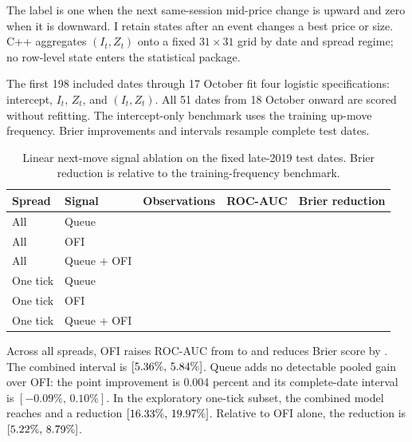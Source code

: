 \documentclass[11pt,a4paper]{article}
\begin{document}
The label is one when the next same-session mid-price change is upward and zero
when it is downward. I retain states after an event changes a best price or
size. C++ aggregates $(I_t,Z_t)$ onto a fixed $31\times31$ grid by date and
spread regime; no row-level state enters the statistical package.

The first 198 included dates through 17 October fit four logistic
specifications: intercept, $I_t$, $Z_t$, and $(I_t,Z_t)$. All 51 dates from 18
October onward are scored without refitting. The intercept-only benchmark uses
the training up-move frequency. Brier improvements and intervals resample
complete test dates.

\begin{table}[H]
  \centering
  \caption{Linear next-move signal ablation on the fixed late-2019 test dates.
  Brier reduction is relative to the training-frequency benchmark.}
  \label{tab:queueforecast}
  \small
  \begin{tabular}{llrrr}
    \toprule
    Spread & Signal & Observations & ROC-AUC & Brier reduction \\
    \midrule
    All & Queue & \QueueAllObservations{} & \QueueAllAuc{} & \QueueAllBrierReduction{} \\
    All & OFI & \QueueAllObservations{} & \OfiAllAuc{} & \OfiAllBrierReduction{} \\
    All & Queue + OFI & \QueueAllObservations{} & \CombinedAllAuc{} & \CombinedAllBrierReduction{} \\
    One tick & Queue & \QueueOneTickObservations{} & \JointQueueOneTickAuc{} & \JointQueueOneTickBrierReduction{} \\
    One tick & OFI & \QueueOneTickObservations{} & \OfiOneTickAuc{} & \OfiOneTickBrierReduction{} \\
    One tick & Queue + OFI & \QueueOneTickObservations{} & \CombinedOneTickAuc{} & \CombinedOneTickBrierReduction{} \\
    \bottomrule
  \end{tabular}
\end{table}

Across all spreads, OFI raises ROC-AUC from \QueueAllAuc{} to \OfiAllAuc{} and
reduces Brier score by \OfiAllBrierReduction{}. The combined interval is
$[5.36\%{},\,5.84\%{}]$. Queue adds no detectable pooled
gain over OFI: the point improvement is 0.004 percent and its complete-date
interval is $[-0.09\%,\,0.10\%]$. In the exploratory one-tick subset, the
combined model reaches \CombinedOneTickAuc{} and a
\CombinedOneTickBrierReduction{} reduction
$[16.33\%{},\,19.97\%{}]$. Relative to OFI alone,
the reduction is \CombinedVsOfiOneTick{}
$[5.22\%{},\,8.79\%{}]$.
\end{document}
